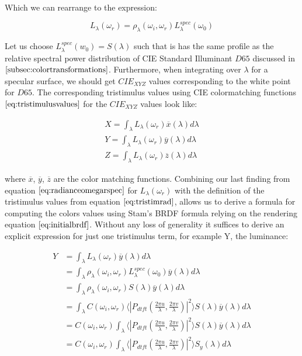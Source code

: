 Which we can rearrange to the expression: 

\begin{equation}
L_\lambda(\omega_r) = \rho_\lambda(\omega_i,\omega_r)L_\lambda^{spec}(\omega_0)
\label{eq:radianceomegarspec}
\end{equation}

Let us choose $L_\lambda^{spec}(w_0) = S(\lambda)$ such that is has the same profile as the relative spectral power distribution of CIE Standard Illuminant $D65$ discussed in $\ref{subsec:colortransformations}$. Furthermore, when integrating over $\lambda$ for a specular surface, we should get $CIE_{XYZ}$ values corresponding to the white point for $D65$. The corresponding tristimulus values using CIE colormatching functions $\ref{eq:tristimulusvalues}$ for the $CIE_{XYZ}$ values look like:

\begin{align}
X = \int_{\lambda}L_\lambda(\omega_r)\overline{x}(\lambda)d\lambda \nonumber \\
Y = \int_{\lambda}L_\lambda(\omega_r)\overline{y}(\lambda)d\lambda \nonumber \\
Z = \int_{\lambda}L_\lambda(\omega_r)\overline{z}(\lambda)d\lambda
\label{eq:tristimrad}
\end{align}

where $\overline{x}$, $\overline{y}$, $\overline{z}$ are the color matching functions. Combining our last finding from equation $\ref{eq:radianceomegarspec}$ for $L_\lambda(\omega_r)$ with the definition of the tristimulus values from equation $\ref{eq:tristimrad}$, allows us to 
derive a formula for computing the colors values using Stam's BRDF formula relying on the rendering equation $\ref{eq:initialbrdf}$. Without any loss of generality it suffices to derive an explicit expression for just one tristimulus term, for example Y, the luminance:

\begin{align}
Y 
& =\int_{\lambda}L_\lambda(\omega_r)\overline{y}(\lambda)d\lambda \nonumber \\
& =\int_{\lambda}\rho_\lambda(\omega_i,\omega_r)L_\lambda^{spec}(\omega_0) \overline{y}(\lambda)d\lambda \nonumber \\
& =\int_{\lambda}\rho_\lambda(\omega_i,\omega_r) S(\lambda) \overline{y}(\lambda)d\lambda \nonumber \\
& =\int_{\lambda} C(\omega_i,\omega_r) \langle \left|P_{dtft}(\frac{2\pi u}{\lambda}, \frac{2\pi v}{\lambda})\right|^2\rangle S(\lambda) \overline{y}(\lambda)d\lambda \nonumber \\
& = C(\omega_i,\omega_r) \int_{\lambda} \langle \left|P_{dtft}(\frac{2\pi u}{\lambda}, \frac{2\pi v}{\lambda})\right|^2\rangle S(\lambda) \overline{y}(\lambda)d\lambda \nonumber \\
& = C(\omega_i,\omega_r) \int_{\lambda} \langle \left|P_{dtft}(\frac{2\pi u}{\lambda}, \frac{2\pi v}{\lambda})\right|^2\rangle S_y(\lambda)d\lambda
\end{align}

